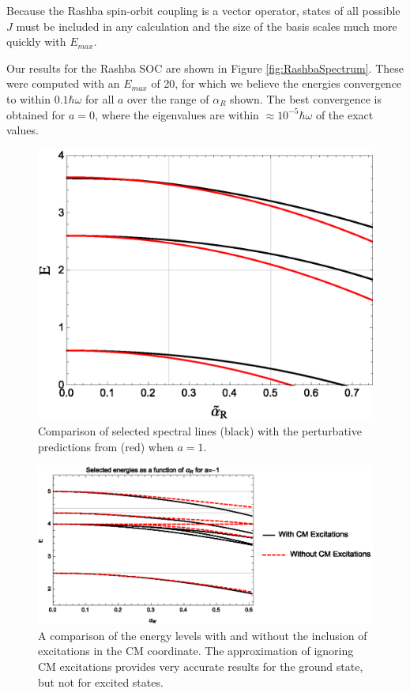 \documentclass[%
 preprint,
 amsmath,amssymb,
 aps,
]{revtex4-1}
\begin{document}
Because the Rashba spin-orbit coupling is a vector operator, states of all possible $J$ must be included in any calculation and the size of the basis scales much more quickly with $E_{max}$. 

Our results for the Rashba SOC are shown in Figure \ref{fig:RashbaSpectrum}. These were computed with an $E_{max}$ of 20, for which we believe the energies convergence to within $0.1\hbar\omega$ for all $a$ over the range of $\alpha_R$ shown. The best convergence is obtained for $a=0$, where the eigenvalues are within $\approx 10^{-5} \hbar \omega$ of the exact values.

\begin{figure}
\includegraphics[height=0.4\linewidth]{Figures/ComparisonWithPertap1}
\caption{\label{fig:ComparisonSpectrum} Comparison of selected spectral lines (black) with the perturbative predictions from \cite{PhysRevA.89.033606} (red) when $a=1$. } 
\end{figure}

\begin{figure}
\includegraphics[width=0.9\linewidth]{Figures/NoCMa-1}
\caption{\label{fig:ComparisonSpectrum2} A comparison of the energy levels with and without the inclusion of excitations in the CM coordinate. The approximation of ignoring CM excitations provides very accurate results for the ground state, but not for excited states.} 
\end{figure}
\end{document}
